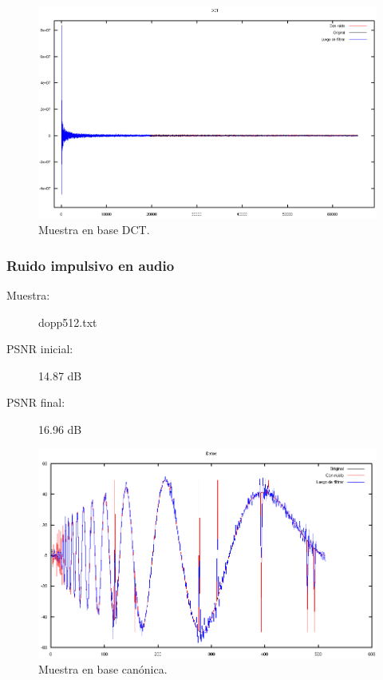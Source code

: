 \documentclass[a4paper,10pt,twoside]{article}
\begin{document}
\begin{figure}[H]
  \centering
  \includegraphics[width=15cm]{graficos/lena_aditivo_umbralizar_dct.png} 
  \caption{Muestra en base DCT.}
\end{figure}


\subsubsection{Ruido impulsivo en audio}

\begin{description}
  \item[Muestra:] dopp512.txt
  \item[PSNR inicial:] 14.87 dB
  \item[PSNR final:] 16.96 dB
\end{description}

\begin{figure}[H]
  \centering
  \includegraphics[width=15cm]{graficos/dopp_impulsivo_umbralizar_muestra.png}
  \caption{Muestra en base canónica.}
\end{figure}
\end{document}
